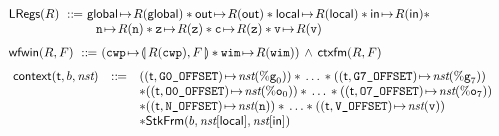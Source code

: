 \begin{figure}[!t]
\[\begin{array}{l}
            \\[-5pt]
            \LRegs{\RFile} \ \define \ \regst{\globalRN}{\RFile(\globalRN)} \sepstar 
            \regst{\outRN}{\RFile(\outRN)} \sepstar \regst{\localRN}{\RFile(\localRN)} 
            \sepstar \regst{\inRN}{\RFile(\inRN)} \sepstar \\
            \hspace*{7em} \regst{\regn}{\RFile(\regn)} \sepstar 
            \regst{\regz}{\RFile(\regz)} \sepstar \regst{\regc}{\RFile(\regz)} 
            \sepstar \regst{\regv}{\RFile(\regv)}
            \\
            \\[-5pt]
            \wfwin{\RFile}{\Wstack} \ \define \ 
            (\stackAstP{\RFile(\regcwp)}{\Wstack} \sepstar 
                \regst{\regwim}{\RFile(\regwim)}) 
            \, \land \, \ctxfm(\RFile, \Wstack)
            \\
            \\[-5pt]
            \hspace*{-0.15em}
            \begin{array}{lll}
                \relcontext{\thrdid}{\block}{\nst} & \define & 
                (\msto{(\thrdid, \ofsGOne)}{\nst(\greg{0})}) 
                \sepstar \, \dots \, \sepstar
                (\msto{(\thrdid, \ofsGEig)}{\nst(\greg{7})}) \\
                & & 
                \sepstar
                (\msto{(\thrdid, \ofsOOne)}{\nst(\oreg{0})}) 
                \sepstar \, \dots \, \sepstar
                (\msto{(\thrdid, \ofsOEig)}{\nst(\oreg{7})}) \\
                & & 
                \sepstar 
                (\msto{(\thrdid, \ofsN)}{\nst(\regn)}) \sepstar \, \dots 
                \sepstar (\msto{(\thrdid, \ofsV)}{\nst(\regv)}) \\
                & & 
                \sepstar \RelStkFm{\block}{\nst[\localRN]}{\nst[\inRN]}

\end{array}
\end{array}\]
\end{figure}
